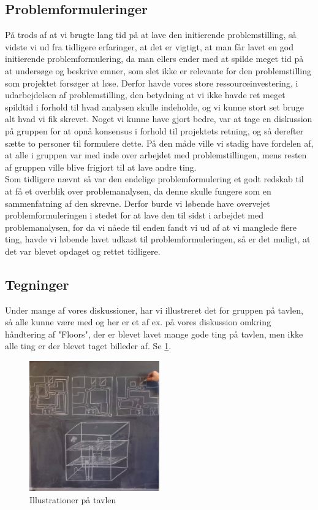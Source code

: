 \documentclass[a4paper,12pt,oneside,article]{memoir}
\begin{document}
        \subsection{Problemformuleringer}

        På trods af at vi brugte lang tid på at lave den initierende problemstilling, så vidste vi ud fra tidligere erfaringer, at det er vigtigt, at man får lavet en god initierende problemformulering, da man ellers ender med at spilde meget tid på at undersøge og beskrive emner, som slet ikke er relevante for den problemstilling som projektet forsøger at løse. Derfor havde vores store ressourceinvestering, i udarbejdelsen af problemstilling, den betydning at vi ikke havde ret meget spildtid i forhold til hvad analysen skulle indeholde, og vi kunne stort set bruge alt hvad vi fik skrevet. Noget vi kunne have gjort bedre, var at tage en diskussion på gruppen for at opnå konsensus i forhold til projektets retning, og så derefter sætte to personer til formulere dette. På den måde ville vi stadig have fordelen af, at alle i gruppen var med inde over arbejdet med problemstillingen, mens resten af gruppen ville blive frigjort til at lave andre ting. \\
        Som tidligere nævnt så var den endelige problemformulering et godt redskab til at få et overblik over problemanalysen, da denne skulle fungere som en sammenfatning af den skrevne. Derfor burde vi løbende have overvejet problemformuleringen i stedet for at lave den til sidst i arbejdet med problemanalysen, for da vi nåede til enden fandt vi ud af at vi manglede flere ting, havde vi løbende lavet udkast til problemformuleringen, så er det muligt, at det var blevet opdaget og rettet tidligere.

        
           

        \subsection{Tegninger}
        Under mange af vores diskussioner, har vi illustreret det for gruppen på tavlen, så alle kunne være  med og her er et af ex. på vores diskussion omkring håndtering af "Floors", der er blevet lavet mange gode ting på tavlen, men ikke alle ting er der blevet taget billeder af. Se \cref{fig:floor_tegninger}.

        \begin{figure}[ht!]
            \centering
            \includegraphics[width=0.5\textwidth]{Images/6.jpg}
            \caption{Illustrationer på tavlen}
            \label{fig:floor_tegninger}
        \end{figure}
\end{document}
